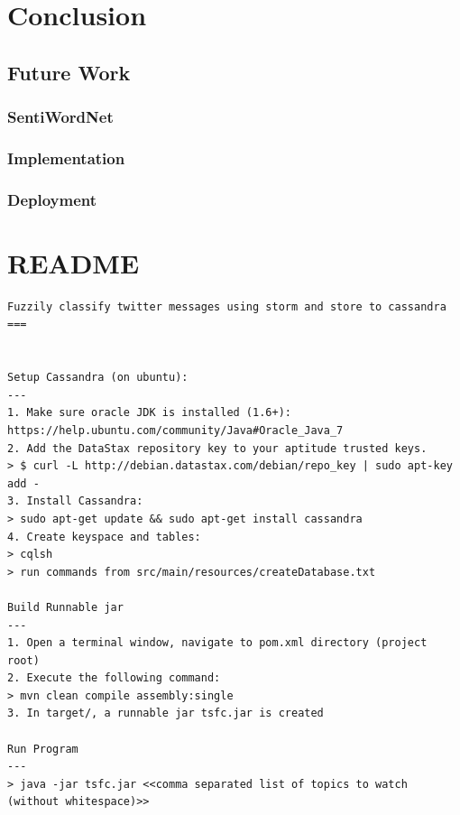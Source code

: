 \documentclass[a4paper]{article}
\begin{document}
\section{Conclusion}
\subsection{Future Work}
\subsubsection{SentiWordNet}
\subsubsection{Implementation}
\subsubsection{Deployment}



\clearpage



\newpage
\appendix

\section{README}
\begin{lstlisting}
Fuzzily classify twitter messages using storm and store to cassandra
===


Setup Cassandra (on ubuntu):
---
1. Make sure oracle JDK is installed (1.6+): https://help.ubuntu.com/community/Java#Oracle_Java_7
2. Add the DataStax repository key to your aptitude trusted keys.
> $ curl -L http://debian.datastax.com/debian/repo_key | sudo apt-key add -
3. Install Cassandra:
> sudo apt-get update && sudo apt-get install cassandra
4. Create keyspace and tables:
> cqlsh
> run commands from src/main/resources/createDatabase.txt

Build Runnable jar
---
1. Open a terminal window, navigate to pom.xml directory (project root)
2. Execute the following command:
> mvn clean compile assembly:single
3. In target/, a runnable jar tsfc.jar is created

Run Program
---
> java -jar tsfc.jar <<comma separated list of topics to watch (without whitespace)>>
\end{lstlisting}
\end{document}
